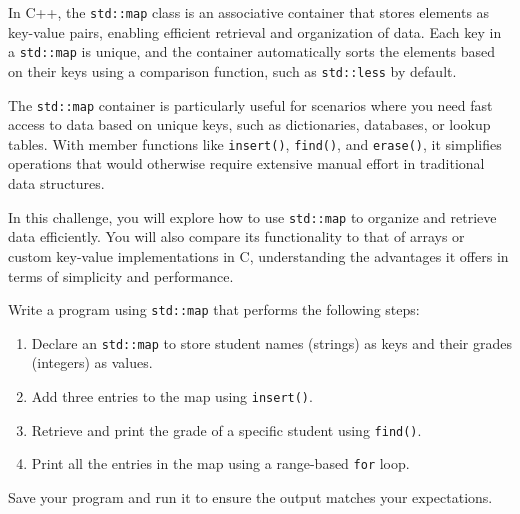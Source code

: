 \begin{challenge}
    \begin{chadescription}
    In C++, the \texttt{std::map} class is an associative container that stores elements as key-value pairs, enabling efficient retrieval and organization of data. 
    Each key in a \texttt{std::map} is unique, and the container automatically sorts the elements based on their keys using a comparison function, such as \texttt{std::less} by default.

    The \texttt{std::map} container is particularly useful for scenarios where you need fast access to data based on unique keys, such as dictionaries, databases, or lookup tables. 
    With member functions like \texttt{insert()}, \texttt{find()}, and \texttt{erase()}, it simplifies operations that would otherwise require extensive manual effort in traditional data structures. 

    In this challenge, you will explore how to use \texttt{std::map} to organize and retrieve data efficiently. 
    You will also compare its functionality to that of arrays or custom key-value implementations in C, understanding the advantages it offers in terms of simplicity and performance.
    \end{chadescription}

    \begin{task}
        Write a program using \texttt{std::map} that performs the following steps:
        \begin{enumerate}
            \item Declare an \texttt{std::map} to store student names (strings) as keys and their grades (integers) as values.
            \item Add three entries to the map using \texttt{insert()}.
            \item Retrieve and print the grade of a specific student using \texttt{find()}.
            \item Print all the entries in the map using a range-based \texttt{for} loop.
        \end{enumerate}

        Save your program and run it to ensure the output matches your expectations.


\end{task}
\end{challenge}
